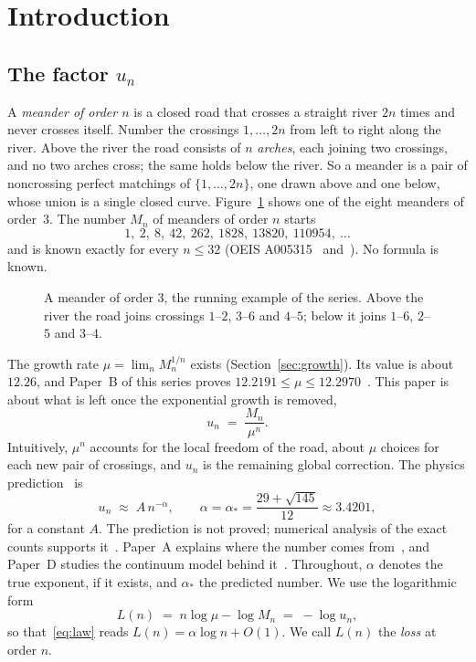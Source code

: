 \section{Introduction}\label{sec:intro}

\subsection{The factor \texorpdfstring{$u_n$}{u\_n}}

A \emph{meander of order $n$} is a closed road that crosses a straight river $2n$ times and never
crosses itself. Number the crossings $1,\ldots,2n$ from left to right along the river. Above the
river the road consists of $n$ \emph{arches}, each joining two crossings, and no two arches cross;
the same holds below the river. So a meander is a pair of noncrossing perfect matchings of
$\{1,\ldots,2n\}$, one drawn above and one below, whose union is a single closed curve.
Figure~\ref{fig:running} shows one of the eight meanders of order~$3$. The number $M_n$ of
meanders of order $n$ starts
\[ 1,\ 2,\ 8,\ 42,\ 262,\ 1828,\ 13820,\ 110954,\ \ldots \]
and is known exactly for every $n\le 32$ (OEIS A005315~\cite{OEIS} and~\cite{Jensen,JensenGit}). No formula is
known.

\begin{figure}[ht]
\centering
\meanderfigure
\caption{A meander of order $3$, the running example of the series. Above the river the road
joins crossings $1$--$2$, $3$--$6$ and $4$--$5$; below it joins $1$--$6$, $2$--$5$ and $3$--$4$.}
\label{fig:running}
\end{figure}

The growth rate $\mu=\lim_n M_n^{1/n}$ exists (Section~\ref{sec:growth}). Its value is about $12.26$,
and Paper~B of this series proves $12.2191\le\mu\le12.2970$~\cite{PaperB}. This paper is about
what is left once the exponential growth is removed,
\[ u_n \;=\; \frac{M_n}{\mu^n}. \]
Intuitively, $\mu^n$ accounts for the local freedom of the road, about $\mu$ choices for each new
pair of crossings, and $u_n$ is the remaining global correction. The physics prediction~\cite{DGG} is
\begin{equation}\label{eq:law}
u_n \;\approx\; A\,n^{-\alpha},\qquad \alpha=\alpha_*=\frac{29+\sqrt{145}}{12}\approx 3.4201,
\end{equation}
for a constant $A$. The prediction is not proved; numerical analysis of the exact counts
supports it~\cite{JG}. Paper~A explains where the number comes from~\cite{PaperA}, and Paper~D
studies the continuum model behind it~\cite{PaperD}. Throughout, $\alpha$ denotes the true exponent,
if it exists, and $\alpha_*$ the predicted number. We use the logarithmic form
\[ L(n) \;=\; n\log\mu-\log M_n \;=\; -\log u_n , \]
so that~\eqref{eq:law} reads $L(n)=\alpha\log n+O(1)$. We call $L(n)$ the \emph{loss} at order $n$.

